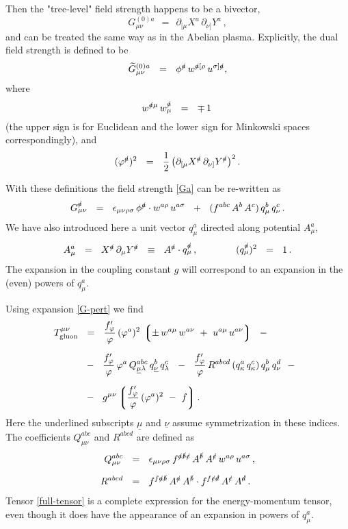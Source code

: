 \documentclass[epsfig,12pt]{article}
\def\beq{\begin{equation}}
\def\eeq{\end{equation}}
\newcommand{\p}{\partial}
\newcommand{\wt}{\widetilde}
\newcommand{\lgr}{\left\lgroup}
\newcommand{\rgr}{\right\rgroup}
\begin{document}
	Then the "tree-level" field strength happens to be a bivector,
\beq
	G_{\mu\nu}^{(0)a}    ~~=~~    \p_{[\mu} X^a\, \p_{\nu]} Y^a\,,
\eeq
	and can be treated the same way as in the Abelian plasma.
	Explicitly, the dual field strength is defined to be
\beq
	\wt{G}{}_{\mu\nu}^{(0)a}    ~~=~~    \phi^\slashed{a}\, w^{\slashed{a}[\rho}\, u^{\sigma]\slashed{a}},
\eeq
	where
\beq
	w^{\slashed{a}\mu}\, w^{\slashed{a}}_\mu    ~~=~~    \mp\,1\,
\eeq
	(the upper sign is for Euclidean and the lower sign for Minkowski spaces correspondingly),
	and
\beq
	( \varphi^\slashed{a} )^2    ~~=~~    \frac{1}{2}\, \big( \p_{[\mu} X^\slashed{a}\, \p_{\nu]} Y^\slashed{a} \big)^2\,.
\eeq

	With these definitions the field strength \eqref{Ga} can be re-written as
\beq
\label{G-pert}
	G_{\mu\nu}^\slashed a    ~~=~~    \epsilon_{\mu\nu\rho\sigma}\, \phi^\slashed{a} \cdot w^{a\rho}\, u^{a\sigma}
				 ~~+~~  ( f^{abc}\, A^b\, A^c )\, q_\mu^b\, q_\nu^c\,.
\eeq
	We have also introduced here a unit vector $ q^a_\mu $ directed along potential $ A_\mu^a $,
\beq
	A_\mu^a    ~~=~~    X^\slashed a\, \p_\mu Y^\slashed a    ~~\equiv~~    A^\slashed a \cdot q_\mu^\slashed a\,,
	\qquad\qquad
	( q_\mu^\slashed a )^2    ~~=~~    1\,.
\eeq
	The expansion in the coupling constant $ g $ will correspond to an expansion in the (even) powers of $ q_\mu^a $.

	Using expansion \eqref{G-pert} we find
\begin{align}
%
\notag
	T_\text{gluon}^{\mu\nu}    & ~~=~~    \frac{f^\prime_\varphi}{\varphi}\, (\varphi^a)^2\,
					      \lgr \pm\, w^{a\mu}\, w^{a\nu}  ~+~  u^{a\mu}\, u^{a\nu} \rgr    ~~-~~
	\\[2mm]
%
\label{full-tensor}
				   & ~~-~~  \frac{f^\prime_\varphi}{\varphi}\, \varphi^a\,
					    Q^{abc}_{\underline{\mu}\lambda}\, q^b_{\underline{\nu}}\, q^c_\lambda
				     ~~-~~  \frac{f^\prime_\varphi}{\varphi}\,
					    R^{abcd}\, ( q^a_\kappa\, q^c_\kappa )\, q^b_\mu\, q^d_\nu    ~~-~~
	\\[2mm]
%
\notag
				   & ~~-~~  g^{\mu\nu}
					    \lgr \frac{f^\prime_\varphi}{\varphi}\, (\varphi^a)^2  ~-~  f \rgr .
\end{align}
	Here the underlined subscripts $ \underline{\mu} $ and $ \underline{\nu} $ assume symmetrization
	in these indices.
	The coefficients $ Q^{abc}_{\mu\nu} $ and $ R^{abcd} $ are defined as
\begin{align*}
%
	Q^{abc}_{\mu\nu}    & ~~=~~    \epsilon_{\mu\nu\rho\sigma}\,
				       f^{\slashed a\slashed b\slashed c}\, A^\slashed{b}\, A^\slashed{c}\,
				       w^{a\rho}\, u^{a\sigma}\,,
	\\[2mm]
%
	R^{abcd}    & ~~=~~    f^{f\slashed a\slashed b}\, A^\slashed{a}\, A^\slashed{b} \cdot
			       f^{f\slashed c\slashed d}\, A^\slashed{c}\, A^\slashed{d}\,.
\end{align*}
	Tensor \eqref{full-tensor} is a complete expression for the energy-momentum tensor,
	even though it does have the appearance of an expansion in powers of $ q^a_\mu $.
\end{document}
